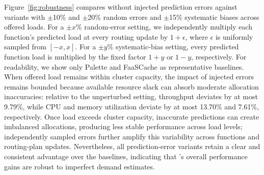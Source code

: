 Figure~\ref{fig:robustness} compares \sysname without injected prediction errors
against variants with $\pm$10\% and $\pm$20\% random errors and $\pm$15\%
systematic biases across offered loads. For a $\pm x\%$ random-error setting,
we independently multiply each function's predicted load at every routing update
by $1+\epsilon$, where $\epsilon$ is uniformly sampled from $[-x,x]$. For a
$\pm y\%$ systematic-bias setting, every predicted function load is multiplied
by the fixed factor $1+y$ or $1-y$, respectively. For readability, we show only
Palette and FaaSCache as representative baselines. When offered load remains
within cluster capacity, the impact of injected errors remains bounded because
available resource slack can absorb moderate allocation inaccuracies: relative
to the unperturbed setting, throughput deviates by at most 9.79\%, while CPU and
memory utilization deviate by at most 13.70\% and 7.61\%, respectively. Once load exceeds
cluster capacity, inaccurate predictions can create imbalanced allocations,
producing less stable performance across load levels; independently sampled
errors further amplify this variability across functions and routing-plan updates.
Nevertheless, all prediction-error variants retain a
clear and consistent advantage over the baselines, indicating that \sysname's
overall performance gains are robust to imperfect demand estimates.

